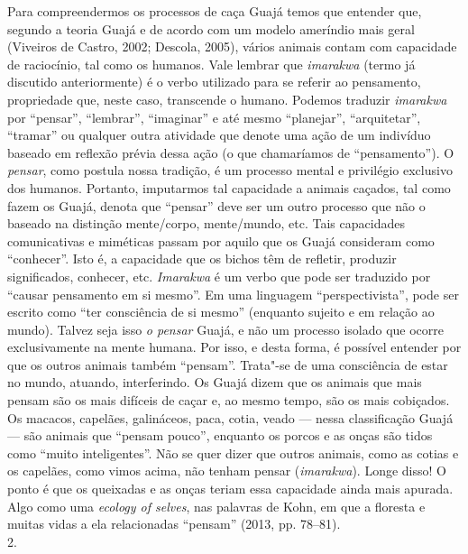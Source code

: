 Para compreendermos os processos de caça Guajá temos que entender que,
segundo a teoria Guajá e de acordo com um modelo ameríndio mais geral
(Viveiros de Castro, 2002; Descola, 2005), vários animais contam com
capacidade de raciocínio, tal como os humanos. Vale lembrar que
\emph{imarakwa} (termo já discutido anteriormente) é o verbo utilizado
para se referir ao pensamento, propriedade que, neste caso, transcende o
humano. Podemos traduzir \emph{imarakwa} por ``pensar'', ``lembrar'',
``imaginar'' e até mesmo ``planejar'', ``arquitetar'', ``tramar'' ou qualquer
outra atividade que denote uma ação de um indivíduo baseado em reflexão
prévia dessa ação (o que chamaríamos de ``pensamento''). O \emph{pensar},
como postula nossa tradição, é um processo mental e privilégio exclusivo
dos humanos. Portanto, imputarmos tal capacidade a animais caçados, tal
como fazem os Guajá, denota que ``pensar'' deve ser um outro processo que
não o baseado na distinção mente/corpo, mente/mundo, etc. Tais
capacidades comunicativas e miméticas passam por aquilo que os Guajá
consideram como ``conhecer''. Isto é, a capacidade que os bichos têm de
refletir, produzir significados, conhecer, etc. \emph{Imarakwa} é um
verbo que pode ser traduzido por ``causar pensamento em si mesmo''. Em uma
linguagem ``perspectivista'', pode ser escrito como ``ter consciência de
si mesmo'' (enquanto sujeito e em relação ao mundo). Talvez seja isso
\emph{o pensar} Guajá, e não um processo isolado que ocorre
exclusivamente na mente humana. Por isso, e desta forma, é possível
entender por que os outros animais também ``pensam''. Trata"-se de uma
consciência de estar no mundo, atuando, interferindo. Os Guajá dizem que
os animais que mais pensam são os mais difíceis de caçar e, ao mesmo
tempo, são os mais cobiçados. Os macacos, capelães, galináceos, paca,
cotia, veado --- nessa classificação Guajá --- são animais que ``pensam
pouco'', enquanto os porcos e as onças são tidos como ``muito
inteligentes''. Não se quer dizer que outros animais, como as cotias e os
capelães, como vimos acima, não tenham pensar (\emph{imarakwa}). Longe
disso! O ponto é que os queixadas e as onças teriam essa capacidade
ainda mais apurada. Algo como uma \emph{ecology of selves}, nas palavras
de Kohn, em que a floresta e muitas vidas a ela relacionadas ``pensam''
(2013, pp. 78--81).
\\

2.

